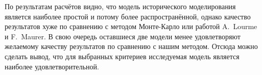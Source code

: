 По результатам расчётов видно, что модель исторического моделирования является наиболее простой и потому более распространённой, однако качество результатов хуже по сравнению с методом Монте-Карло или работой A.~Lourme и F.~Maurer. 
В свою очередь оставшиеся две модели менее удовлетворяют желаемому качеству результатов по сравнению с нашим методом.
Отсюда можно сделать вывод, что для выбранных критериев исследуемая модель является наиболее удовлетворительной.










